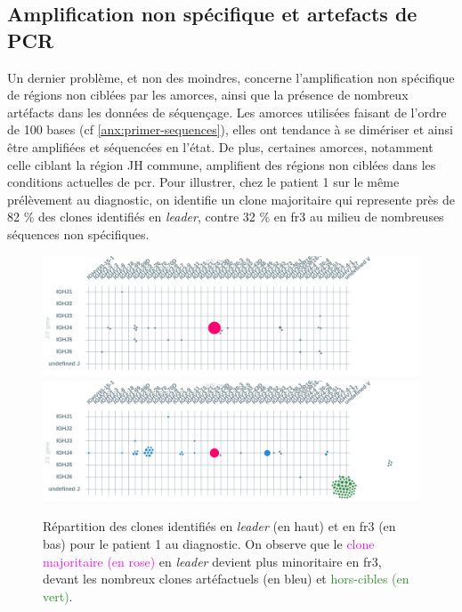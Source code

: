 \subsection{Amplification non spécifique et artefacts de PCR}

Un dernier problème, et non des moindres, concerne l'amplification non
spécifique de régions non ciblées par les amorces, ainsi que la présence de
nombreux artéfacts dans les données de séquençage. Les amorces utilisées
faisant de l'ordre de 100 bases (cf \autoref{anx:primer-sequences}), elles ont
tendance à se dimériser et ainsi être amplifiées et séquencées en l'état. De
plus, certaines amorces, notamment celle ciblant la région JH commune,
amplifient des régions non ciblées dans les conditions actuelles de \gls{pcr}.
Pour illustrer, chez le patient 1 sur le même prélèvement au diagnostic, on
identifie un clone majoritaire qui represente près de 82 \% des clones
identifiés en \textit{leader}, contre 32 \% en \gls{fr}3 au milieu de
nombreuses séquences non spécifiques.

\begin{figure}[H]
    \centering
    \includegraphics[width=1\textwidth]{images/diag_leader.png}
    \vspace{0.5cm}
    \includegraphics[width=1\textwidth]{images/diag_fr3.png}
    \caption{
        Répartition des clones identifiés en \textit{leader} (en haut) et en \gls{fr}3 (en bas)
        pour le patient 1 au diagnostic. On observe que le \textcolor{Magenta}{clone majoritaire (en rose)}
        en \textit{leader} devient plus minoritaire en \gls{fr}3, devant les \textcolor{ProcessBlue}{nombreux clones artéfactuels (en bleu)}
        et \textcolor{ForestGreen}{hors-cibles (en vert)}.
    }
    \label{fig:fr3-vs-leader}
\end{figure}

